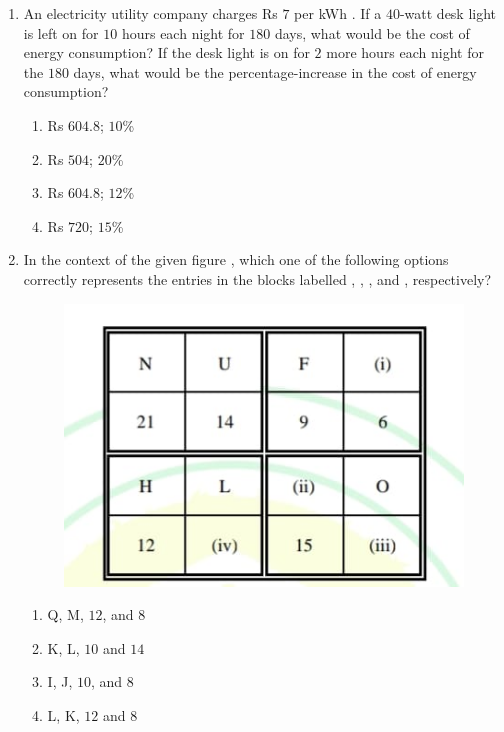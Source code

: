 \documentclass[journal,12pt,onecolumn]{article}
\theoremstyle{remark}
\begin{document}
\begin{enumerate}
    \item An electricity utility company charges Rs $7$ per kWh . If a $40$-watt desk light is left on for $10$ hours each night for $180$ days, what would be the cost of energy consumption? If the desk light is on for $2$ more hours each night for the $180$ days, what would be the percentage-increase in the cost of energy consumption?
    
    \hfill{}
    \begin{enumerate}
        \item Rs $604.8$; $10$\%
        \item Rs $504$; $20$\%
        \item Rs $604.8$; $12$\%
        \item Rs $720$; $15$\%
    \end{enumerate}

    \item In the context of the given figure , which one of the following options correctly represents the entries in the blocks labelled , , , and , respectively?
    \begin{figure}[H]
        \centering
        \includegraphics[width=0.7\columnwidth]{figs/2q-4.jpg}
        \caption{}
        \label{fig:q4}
    \end{figure}

    \hfill{}
    \begin{enumerate}
        \item Q, M, $12$, and $8$
        \item K, L, $10$ and $14$
        \item I, J, $10$, and $8$
        \item L, K, $12$ and $8$
    \end{enumerate}


\end{enumerate}
\end{document}
